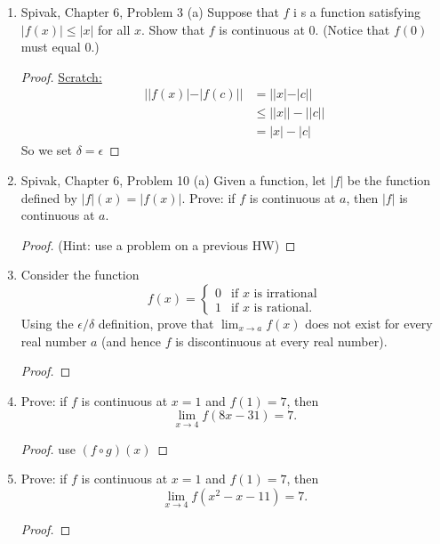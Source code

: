 \documentclass{article} %
\theoremstyle{plain}
\theoremstyle{definition}
\theoremstyle{case}
\newcommand{\abs}[1]{\left\lvert #1 \right\rvert} %
\begin{document}
\begin{enumerate}[label={\fbox{\textbf{Exercise \#\arabic* :}}}]
\newpage
\item Spivak, Chapter 6, Problem 3 (a)
  Suppose that $f$ i s a function satisfying $|f(x)| \leq |x|$
  for all $x$. Show that $f$ is continuous at $0$. (Notice that $f(0)$
  must equal 0.)

\begin{proof}
    \underline{Scratch:}
      \begin{align*}
        ||f(x)| - |f(c)|| &= ||x| - |c|| \\
                          &\leq ||x|| - ||c|| \\
                          &= |x| - |c|
      \end{align*}
      So we set $\delta = \epsilon$

\end{proof}


\newpage
\item Spivak, Chapter 6, Problem 10 (a)
  Given a function, let $\abs{f}$ be the function defined by
  $\abs{f}(x) = \abs{f(x)}$. Prove: if $f$ is continuous at $a$, then
  $\abs{f}$ is continuous at $a$.

\begin{proof} (Hint: use a problem on a previous HW)
\end{proof}


\newpage
\item Consider the function
$$f(x) = \begin{cases} 0 & \text{if $x$ is irrational} \\
1 & \text{if $x$ is rational.}
\end{cases}
$$
Using the $\epsilon/\delta$ definition, prove that $\lim_{x \rightarrow a} f(x)$ does not exist for every real number $a$ (and hence $f$ is discontinuous at every real number).

\begin{proof}
\end{proof}

\newpage
\item Prove: if $f$ is continuous at $x=1$ and $f(1) = 7$,
then
$$
\lim_{x \rightarrow 4} f(8x-31) = 7.
$$

\begin{proof}
    use $(f \circ g)(x)$
\end{proof}

\newpage
\item Prove: if $f$ is continuous at $x=1$ and $f(1) = 7$,
then
$$
\lim_{x \rightarrow 4} f(x^2-x-11) = 7.
$$

\begin{proof}
\end{proof}


\end{enumerate}
\end{document}
